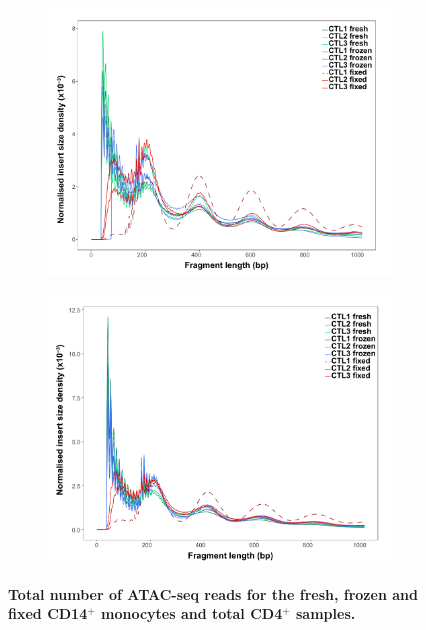 \begin{figure}[htbp]
\centering
\begin{subfigure}{0.5\textwidth}
\centering
\includegraphics[width=\textwidth]{./Results1/pdfs/Core_ATAC_CD14_fresh_frozen_fixed_frag_size_distribution}
\caption{\textbf{}}
\end{subfigure}%
\begin{subfigure}{0.5\textwidth}
\centering
\includegraphics[width=\textwidth]{./Results1/pdfs/Core_ATAC_CD4_fresh_frozen_fixed_frag_size_distribution}
\caption{\textbf{}}
\end{subfigure}
\caption[Total number of ATAC-seq reads for the fresh, frozen and fixed CD14$^+$ monocytes and total CD4$^+$ samples.]{\textbf{Total number of ATAC-seq reads for the fresh, frozen and fixed CD14$^+$ monocytes and total CD4$^+$ samples.}}
\label{figure:Core_ATAC_all_conditions_total_reads}
\end{figure} 




